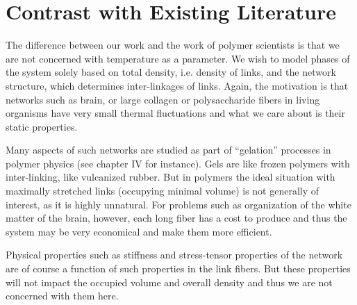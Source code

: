 \documentclass[nofootinbib,preprint,floatfix,titlepage,endfloats,superscriptaddress]{revtex4} %
\newcommand{\outNim}[1]{}
\begin{document}
\outNim{
\subsection{Other links}

We will implement the curved-space rubber-band similar to flat space. The repulsive force from other links is a function of their geodesic distance, but that is hard to calculate in curved space. Since we assume the force to be short-ranged, we will use a constant metric, based on the midpoint between the two points to calculate the distance between the two points and won't use accurate geodesic distance. 

Also, we will add this repulsive force directly as a force on the l.h.s. of the geodesic equation and won't try to incorporate it into the metric and derive perturbed Christoffel symbols. 
Thus we will only need to define a global metric function.  

}



\section{Contrast with Existing Literature}
The difference between our work and the work of polymer scientists is that we are not concerned with temperature as a parameter. We wish to model phases of the system solely based on total density, i.e. density of links, and the network structure, which determines inter-linkages of links. Again, the motivation is that networks such as brain, or large collagen or polysaccharide fibers in living organisms have very small thermal fluctuations and what we care about is their static properties.

Many aspects of such networks are studied  as part of ``gelation'' processes in polymer physics (see \cite{de1979scaling} chapter IV for instance). Gels are like frozen polymers with inter-linking, like vulcanized rubber. But in polymers the ideal situation with maximally stretched links (occupying minimal volume) is not generally of interest, as it is highly unnatural. For problems such as organization of the white matter of the brain, however, each long fiber has a cost to produce and thus the system may be very economical and make them more efficient.

Physical properties such as stiffness and stress-tensor properties of the network are of course a function of such properties in the link fibers. But these properties will not impact the occupied volume and overall density and thus we are not concerned with them here. 
\end{document}

